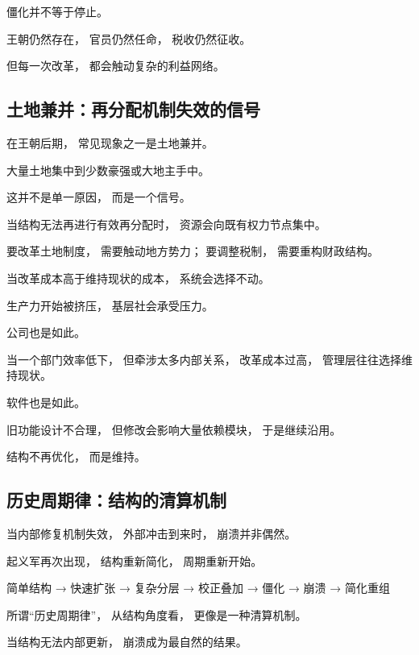 \documentclass[../main.tex]{subfiles}
\begin{document}
僵化并不等于停止。

王朝仍然存在，
官员仍然任命，
税收仍然征收。

但每一次改革，
都会触动复杂的利益网络。

\subsection{土地兼并：再分配机制失效的信号}

在王朝后期，
常见现象之一是土地兼并。

大量土地集中到少数豪强或大地主手中。

这并不是单一原因，
而是一个信号。

\begin{readingnote}
	当结构无法再进行有效再分配时，
	资源会向既有权力节点集中。
\end{readingnote}

要改革土地制度，
需要触动地方势力；
要调整税制，
需要重构财政结构。

当改革成本高于维持现状的成本，
系统会选择不动。

生产力开始被挤压，
基层社会承受压力。

公司也是如此。

当一个部门效率低下，
但牵涉太多内部关系，
改革成本过高，
管理层往往选择维持现状。

软件也是如此。

旧功能设计不合理，
但修改会影响大量依赖模块，
于是继续沿用。

结构不再优化，
而是维持。

\subsection{历史周期律：结构的清算机制}

当内部修复机制失效，
外部冲击到来时，
崩溃并非偶然。

起义军再次出现，
结构重新简化，
周期重新开始。

\begin{examplebox}
	简单结构 → 快速扩张 → 复杂分层 → 校正叠加 → 僵化 → 崩溃 → 简化重组
\end{examplebox}

所谓“历史周期律”，
从结构角度看，
更像是一种清算机制。

当结构无法内部更新，
崩溃成为最自然的结果。

\end{document}
